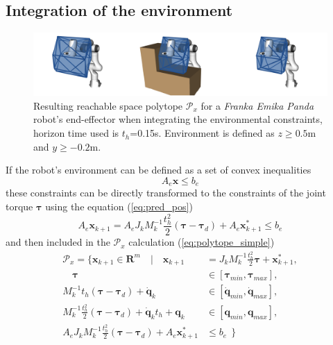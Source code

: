 \subsection{Integration of the environment}

\begin{figure}[!t]
    \centering
    \includegraphics[width=0.75\linewidth]{Papers/images/env.png}
    \caption{Resulting reachable space polytope $\mathcal{P}_x$ for a \textit{Franka Emika Panda} robot's end-effector when integrating the environmental constraints, horizon time used is $t_h$=0.15s. Environment is defined as $z\geq0.5$m and $y\geq-0.2$m.}
    \label{fig:env}
    
\end{figure}

If the robot's environment can be defined as a set of convex inequalities
\begin{equation}
    A_e \bm{x} \leq b_e
\end{equation}
these constraints can be directly transformed to the constraints of the joint torque $\bm{\tau}$ using the equation (\ref{eq:pred_pos})
\begin{equation}
    A_e\bm{x}_{k+1} = A_e J_k M_k^{-1}\frac{t_h^2}{2} (\bm{\tau} -\bm{\tau}_d) + A_e \bm{x}^*_{k+1} \leq b_e
    \label{eq:env_limits}
\end{equation}
and then included in the $\mathcal{P}_x$ calculation (\ref{eq:polytope_simple})
\begin{equation}
\begin{split}
    \mathcal{P}_x = \{ \bm{x}_{k+1} \in \mathbf{R}^m \quad| \quad \bm{x}_{k+1} &= J_k M_k^{-1}\frac{t_h^2}{2}\bm{\tau} + \bm{x}^*_{k+1},\\
   \quad \bm{\tau} &\in \left[\bm{\tau}_{min},\bm{\tau}_{max}\right],\\
    M_k^{-1}t_h (\bm{\tau} -\bm{\tau}_d)+ \dot{\bm{q}}_{k} &\in \left[\dot{\bm{q}}_{min},\dot{\bm{q}}_{max}\right],\\
   M_k^{-1}\frac{t_h^2}{2}(\bm{\tau} -\bm{\tau}_d) +  \dot{\bm{q}}_{k}t_h + \bm{q}_{k} &\in \left[\bm{q}_{min},\bm{q}_{max}\right],\\
   A_e J_k M_k^{-1}\frac{t_h^2}{2} (\bm{\tau} -\bm{\tau}_d) + A_e \bm{x}^*_{k+1} &\leq b_e ~~\}
\end{split} 
\label{eq:env}
\end{equation}

